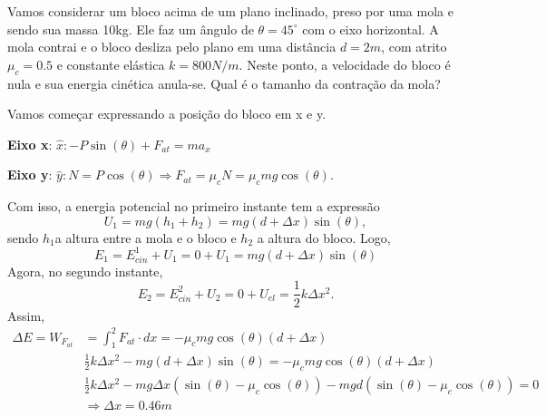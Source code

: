 \documentclass[physics_notes.tex]{subfiles}
\begin{document}
\begin{example}
	Vamos considerar um bloco acima de um plano inclinado, preso por uma mola e sendo sua massa 10kg.
	Ele faz um ângulo de \(\theta =45^{\circ}\) com o eixo horizontal. A mola contrai e o bloco desliza pelo plano em uma distância \(d=2m\),
	com atrito \(\mu_{c}=0.5\) e constante elástica \(k=800N/m\). Neste ponto, a velocidade do bloco é nula e
	sua energia cinética anula-se. Qual é o tamanho da contração da mola?

	Vamos começar expressando a posição do bloco em x e y.

	\textbf{Eixo x}: \(\hat{x}: -P\sin{(\theta )} + F_{at} = ma_{x}\)

	\textbf{Eixo y}: \(\hat{y}: N = P\cos{(\theta )} \Rightarrow F_{at}=\mu_{c}N = \mu_{c}mg\cos{(\theta )}.\)

	Com isso, a energia potencial no primeiro instante tem a expressão
	\[
		U_{1} = mg(h_{1}+h_{2}) = mg(d+\Delta x)\sin{(\theta )},
	\]
	sendo \(h_{1}\)a altura entre a mola e o bloco e \(h_{2}\) a altura do bloco. Logo,
	\[
		E_{1} = E_{cin}^{1} + U_{1} = 0 + U_{1} = mg(d + \Delta x)\sin(\theta )
	\]
	Agora, no segundo instante,
	\[
		E_{2} = E_{cin}^{2} + U_{2} = 0 + U_{el} = \frac{1}{2}k\Delta x^{2}.
	\]
	Assim,
	\begin{align*}
		\Delta E = W_{F_{at}} & = \int_{1}^{2} F_{at}\cdot dx = -\mu_{c}mg\cos{(\theta )}(d+\Delta x)                                                       \\
		                      & \frac{1}{2}k\Delta x^{2} - mg(d+\Delta x)\sin{(\theta )} = -\mu_{c}mg\cos{(\theta )}(d+\Delta x)                            \\
		                      & \frac{1}{2}k\Delta x^{2} - mg\Delta x(\sin{(\theta )}-\mu_c\cos{(\theta )}) - mgd(\sin{(\theta )}-\mu_{c}\cos{(\theta )})=0 \\
		                      & \Rightarrow \Delta x=0.46m
	\end{align*}
\end{example}
\newpage
\end{document}
